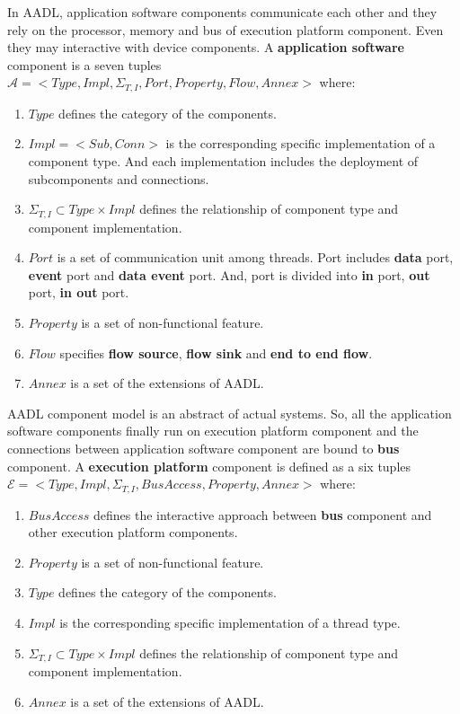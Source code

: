 In AADL, application software components communicate each other and they rely on the processor, memory and bus of execution platform component. Even they may interactive with device components. A \textbf{application software} component is a seven tuples $\mathcal{A} = <Type, Impl, \Sigma_{T, I}, Port, Property, Flow,  Annex>$ where:
\begin{enumerate}
\item $Type$ defines the category of the components. 
\item $Impl = <Sub, Conn>$ is the corresponding specific implementation of a component type. And each implementation includes the deployment of subcomponents and connections.
\item $\Sigma_{T, I}\subset Type\times Impl$ defines the relationship of component type and component implementation.
\item $Port$ is a set of communication unit among threads. Port includes \textbf{data} port, \textbf{event} port and \textbf{data event} port. And, port is divided into \textbf{in} port, \textbf{out} port, \textbf{in out} port.
\item $Property$ is a set of non-functional feature.
\item $Flow$ specifies \textbf{flow source}, \textbf{flow sink} and \textbf{end to end flow}. 
\item $Annex$ is a set of the extensions of AADL.
\end{enumerate}


AADL component model is an abstract of actual systems. So, all the application software components finally run on execution platform component and the connections between application software component are bound to \textbf{bus} component.  A \textbf{execution platform} component is defined as a six tuples $\mathcal{E} = <Type, Impl, \Sigma_{T, I}, BusAccess, Property, Annex>$ where: 
\begin{enumerate}
\item $BusAccess$ defines the interactive approach between \textbf{bus} component and other execution platform components.
\item $Property$ is a set of non-functional feature.
\item $Type$ defines the category of the components. 
\item $Impl$ is the corresponding specific implementation of a thread type.
\item $\Sigma_{T, I}\subset Type\times Impl$ defines the relationship of component type and component implementation.
\item $Annex$ is a set of the extensions of AADL.
\end{enumerate}


